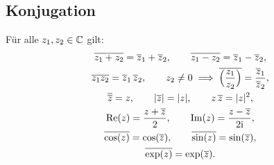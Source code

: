 \subsection{Konjugation}
Für alle $z_1,z_2\in\mathbb C$ gilt:
\begin{gather}
\overline{z_1+z_2} = \overline z_1+\overline z_2,\qquad
\overline{z_1-z_2} = \overline z_1-\overline z_2,\\
\overline{z_1 z_2} = \overline z_1\,\overline z_2,\qquad
z_2\ne 0 \implies \overline{\Big(\frac{z_1}{z_2}\Big)}
= \frac{\overline z_1}{\overline z_2},\\
\overline{\overline z}=z,\qquad
|\overline{z}| = |z|,\qquad
z\,\overline z = |z|^2,\\
\operatorname{Re}(z) = \frac{z+\overline z}{2},\qquad
\operatorname{Im}(z) = \frac{z-\overline z}{2\mathrm i},\\
\overline{\cos(z)} = \cos(\overline z),\qquad
\overline{\sin(z)} = \sin(\overline z),\\
\overline{\exp(z)} = \exp(\overline z).
\end{gather}

